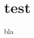 \documentclass{beamer}
\begin{document}
    \section{test}

    \begin{frame}
        bla
    \end{frame}
\end{document}
